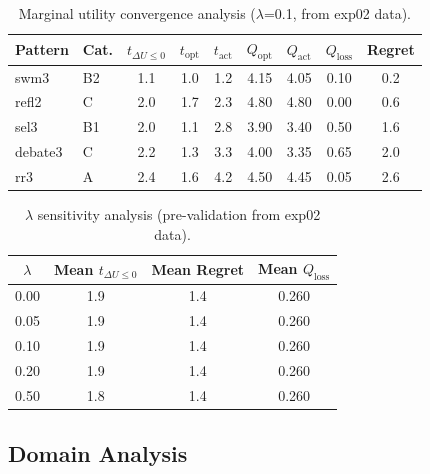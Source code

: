\documentclass{article}
\begin{document}
\begin{table}[H]
\centering
\caption{Marginal utility convergence analysis ($\lambda$=0.1, from exp02 data).}
\label{tab:prevalidation}
{\small
\begin{tabular}{@{}llccccccc@{}}
\toprule
\textbf{Pattern} & \textbf{Cat.} & $t_{\Delta U \leq 0}$ & $t_{\text{opt}}$ & $t_{\text{act}}$ & $Q_{\text{opt}}$ & $Q_{\text{act}}$ & $Q_{\text{loss}}$ & Regret \\
\midrule
swm3 & B2 & 1.1 & 1.0 & 1.2 & 4.15 & 4.05 & 0.10 & 0.2 \\
refl2 & C & 2.0 & 1.7 & 2.3 & 4.80 & 4.80 & 0.00 & 0.6 \\
sel3 & B1 & 2.0 & 1.1 & 2.8 & 3.90 & 3.40 & 0.50 & 1.6 \\
debate3 & C & 2.2 & 1.3 & 3.3 & 4.00 & 3.35 & 0.65 & 2.0 \\
rr3 & A & 2.4 & 1.6 & 4.2 & 4.50 & 4.45 & 0.05 & 2.6 \\
\bottomrule
\end{tabular}
}
\end{table}

\begin{table}[H]
\centering
\caption{$\lambda$ sensitivity analysis (pre-validation from exp02 data).}
\label{tab:lambda_prevalidation}
{\small
\begin{tabular}{@{}cccc@{}}
\toprule
$\lambda$ & Mean $t_{\Delta U \leq 0}$ & Mean Regret & Mean $Q_{\text{loss}}$ \\
\midrule
0.00 & 1.9 & 1.4 & 0.260 \\
0.05 & 1.9 & 1.4 & 0.260 \\
0.10 & 1.9 & 1.4 & 0.260 \\
0.20 & 1.9 & 1.4 & 0.260 \\
0.50 & 1.8 & 1.4 & 0.260 \\
\bottomrule
\end{tabular}
}
\end{table}

\subsection{Domain Analysis}
\end{document}
